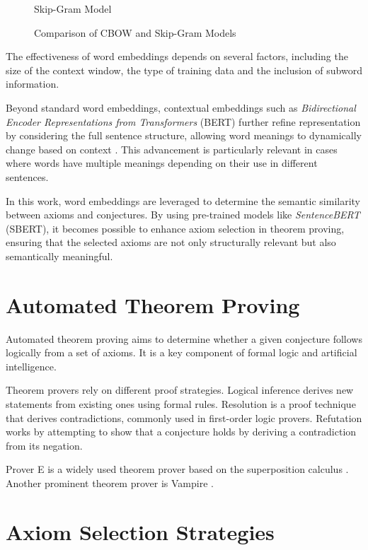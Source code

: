 \documentclass[english,version-2020-11]{uzl-thesis}
\begin{document}
\begin{figure}[h]
\begin{subcaptionblock}{0.45\textwidth}
        \caption{Skip-Gram Model}
    \end{subcaptionblock}
    \caption{Comparison of CBOW and Skip-Gram Models}
\end{figure}


The effectiveness of word embeddings depends on several factors, including the size of the context window, the type of training data and the inclusion of subword information.

Beyond standard word embeddings, contextual embeddings such as \textit{Bidirectional Encoder Representations from Transformers} (BERT) further refine representation by considering the full sentence structure, allowing word meanings to dynamically change based on context \cite{Devlin2019}. This advancement is particularly relevant in cases where words have multiple meanings depending on their use in different sentences.

In this work, word embeddings are leveraged to determine the semantic similarity between axioms and conjectures. By using pre-trained models like \textit{SentenceBERT} (SBERT), it becomes possible to enhance axiom selection in theorem proving, ensuring that the selected axioms are not only structurally relevant but also semantically meaningful.

\section{Automated Theorem Proving}

Automated theorem proving aims to determine whether a given conjecture follows logically from a set of axioms. It is a key component of formal logic and artificial intelligence.

Theorem provers rely on different proof strategies. Logical inference derives new statements from existing ones using formal rules. Resolution is a proof technique that derives contradictions, commonly used in first-order logic provers. Refutation works by attempting to show that a conjecture holds by deriving a contradiction from its negation.

Prover E is a widely used theorem prover based on the superposition calculus \cite{Schulz2019}. Another prominent theorem prover is Vampire \cite{Riazanov2002}.

\section{Axiom Selection Strategies}
\end{document}
